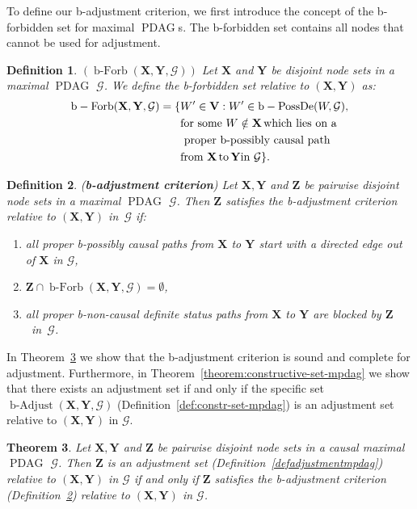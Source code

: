 \documentclass[letterpaper]{article}
\makeatletter
\newtheorem{theorem}{Theorem}[section]
\newtheorem{definition}[theorem]{Definition}
\theoremstyle{definition}
\theoremstyle{remark}
\DeclareMathOperator{\PDAG}{PDAG}
\DeclareMathOperator{\bPossDe}{b-PossDe}
\DeclareMathOperator{\bForbb}{b-Forb}
\DeclareMathOperator{\bAdjust}{b-Adjust}
\newcommand{\mpdag}{maximal $\PDAG$}
\newcommand{\vars}[1][V]{\mathbf{#1}}
\newcommand{\g}[1][G]{\mathcal{#1}}
\newcommand{\badjustb}[2][X,Y]{\bAdjust(\mathbf{#1},#2)}
\newcommand{\bfb}[2][X,Y]{\bForbb(\mathbf{#1},#2)}
\def\cctext#1{\expandafter\@cctext\csname c@#1\endcsname}
\def\@cctext#1{\ifcase#1\or \textbf{b-amenability}\or \textbf{b-forbidden set}\or \textbf{b-blocking}\fi}
\makeatother
\begin{document}
To define our b-adjustment criterion, we first introduce the concept of the b-forbidden set for \mpdag{}s. The b-forbidden set contains all nodes that cannot be used for adjustment.
\begin{definition}$(\bfb{\g})$ Let $\mathbf{X}$ and $\mathbf{Y}$ be disjoint node sets in a \mpdag{} $\g$. We define the b-forbidden set relative to $(\mathbf{X,Y})$ as:
\begin{align}
   \bfb{\g} = \{ & W' \in \vars: W' \in \bPossDe(W,\g), \notag\\
   &\text{for some } W \notin \mathbf{X} \, \text{which lies on a} \notag \\
   &  \text{ proper b-possibly causal path } \notag\\
   & \text{from } \mathbf{X} \,\text{to}\, \mathbf{Y}\text{in } \g\}.\notag
\end{align} \label{def:forbidden nodes}
\end{definition}
\vspace{-.4cm}
\begin{definition}{(\textbf{b-adjustment criterion})}
   Let $\mathbf{X,Y}$ and $\mathbf{Z}$ be pairwise disjoint node sets in a \mpdag{} $\g$. Then $\mathbf{Z}$ satisfies the b-adjustment criterion relative to $(\mathbf{X,Y})$ in~$\g$ if:\vspace{-0.4cm}
   \begin{enumerate}[label = (\cctext*), leftmargin=0.5cm,align=left]
   \item\label{cond0} all proper b-possibly causal paths from $\mathbf{X}$ to $\mathbf{Y}$ start with a directed edge out of $\mathbf{X}$ in $\g$,
   \item\label{cond1} $\mathbf{Z} \cap \bfb{\g} = \emptyset$,
   \item\label{cond2} all proper b-non-causal definite status paths from $\mathbf{X}$ to $\mathbf{Y}$ are blocked by $\mathbf{Z}$~in~$\g$.
   \end{enumerate}  \label{def:gac-pdag}
\end{definition}
In Theorem~\ref{theorem:gac-pdag} we show that the b-adjustment criterion is sound and complete for adjustment.
Furthermore, in Theorem~\ref{theorem:constructive-set-mpdag} we show that there exists an adjustment set if and only if the specific set $\badjustb{\g}$ (Definition~\ref{def:constr-set-mpdag}) is an adjustment set relative to $(\mathbf{X,Y})$ in $\g$. 
\begin{theorem}
     Let $\mathbf{X,Y}$ and $\mathbf{Z}$ be pairwise disjoint node sets in a causal \mpdag{} $\g$. Then $\mathbf{Z}$ is an adjustment set (Definition~\ref{defadjustmentmpdag}) relative to $(\mathbf{X,Y})$ in $\g$ if and only if $\mathbf{Z}$ satisfies the b-adjustment criterion (Definition~\ref{def:gac-pdag}) relative to $(\mathbf{X,Y})$ in $\g$.
   \label{theorem:gac-pdag}
\end{theorem}
\end{document}

